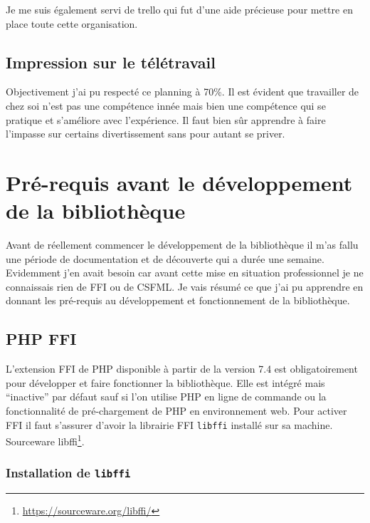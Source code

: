 \documentclass[11pt,a4paper,krantz2,11pt,oneside]{krantz}
\renewcommand{\href}[2]{#2\footnote{\url{#1}}}
\begin{document}
Je me suis également servi de trello qui fut d'une aide précieuse pour mettre en place toute cette organisation.

\hypertarget{impression-sur-le-tuxe9luxe9travail}{%
\subsection{Impression sur le télétravail}\label{impression-sur-le-tuxe9luxe9travail}}

Objectivement j'ai pu respecté ce planning à 70\%. Il est évident que travailler de chez soi n'est pas une compétence innée mais bien une compétence qui se pratique et s'améliore avec l'expérience. Il faut bien sûr apprendre à faire l'impasse sur certains divertissement sans pour autant se priver.

\hypertarget{pre-requis}{%
\section{Pré-requis avant le développement de la bibliothèque}\label{pre-requis}}

Avant de réellement commencer le développement de la bibliothèque il m'as fallu une période de documentation et de découverte qui a durée une semaine. Evidemment j'en avait besoin car avant cette mise en situation professionnel je ne connaissais rien de FFI ou de CSFML. Je vais résumé ce que j'ai pu apprendre en donnant les pré-requis au développement et fonctionnement de la bibliothèque.

\hypertarget{php-ffi}{%
\subsection{PHP FFI}\label{php-ffi}}

L'extension FFI de PHP disponible à partir de la version 7.4 est obligatoirement pour développer et faire fonctionner la bibliothèque. Elle est intégré mais ``inactive'' par défaut \citep{the_php_group_ffi_2019} sauf si l'on utilise PHP en ligne de commande ou la fonctionnalité de pré-chargement de PHP en environnement web. Pour activer FFI il faut s'assurer d'avoir la librairie FFI \texttt{libffi} installé sur sa machine. \href{https://sourceware.org/libffi/}{Sourceware libffi}.

\hypertarget{installation-de-libffi}{%
\subsubsection{\texorpdfstring{Installation de \texttt{libffi}}{Installation de libffi}}\label{installation-de-libffi}}
\end{document}
